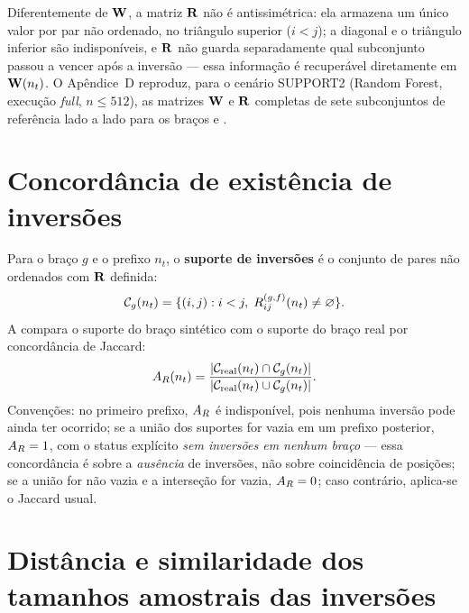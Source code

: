 Diferentemente de $\mathbf{W}$, a matriz $\mathbf{R}$ não é antissimétrica: ela armazena um único valor por par não ordenado, no triângulo superior ($i<j$); a diagonal e o triângulo inferior são indisponíveis, e $\mathbf{R}$ não guarda separadamente qual subconjunto passou a vencer após a inversão --- essa informação é recuperável diretamente em $\mathbf{W}(n_t)$. O Apêndice~D reproduz, para o cenário SUPPORT2 (Random Forest, execução \textit{full}, $n\leq512$), as matrizes $\mathbf{W}$ e $\mathbf{R}$ completas de sete subconjuntos de referência lado a lado para os braços \RealToReal{} e \GaussianToReal.

\section{Concordância de existência de inversões}
\label{sec:ar}

Para o braço $g$ e o prefixo $n_t$, o \textbf{suporte de inversões} é o conjunto de pares não ordenados com $\mathbf{R}$ definida:
\begin{equation}
  \mathcal{C}_g(n_t)=\{(i,j):i<j,\;R^{(g,f)}_{ij}(n_t)\neq\varnothing\}.
\end{equation}
A \ReversalExistenceAgreement{} compara o suporte do braço sintético com o suporte do braço real por concordância de Jaccard:
\begin{equation}
  A_R(n_t)=
  \frac{|\mathcal{C}_{\mathrm{real}}(n_t)\cap\mathcal{C}_g(n_t)|}
       {|\mathcal{C}_{\mathrm{real}}(n_t)\cup\mathcal{C}_g(n_t)|}.
  \label{eq:ar}
\end{equation}
Convenções: no primeiro prefixo, $A_R$ é indisponível, pois nenhuma inversão pode ainda ter ocorrido; se a união dos suportes for vazia em um prefixo posterior, $A_R=1$, com o status explícito \emph{sem inversões em nenhum braço} --- essa concordância é sobre a \emph{ausência} de inversões, não sobre coincidência de posições; se a união for não vazia e a interseção for vazia, $A_R=0$; caso contrário, aplica-se o Jaccard usual.

\section{Distância e similaridade dos tamanhos amostrais das inversões}
\label{sec:sr}

